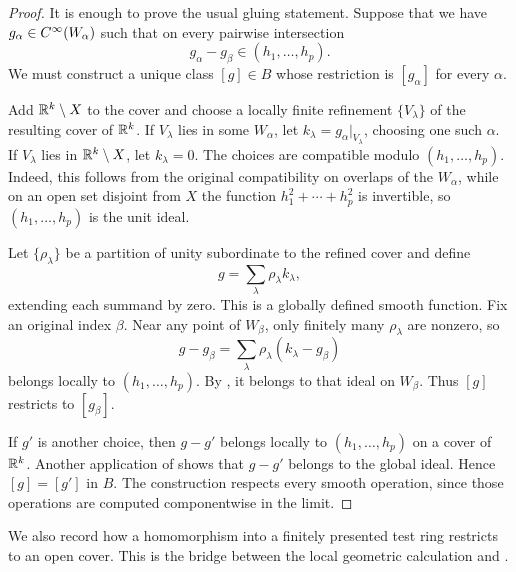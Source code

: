 \begin{proof}
  It is enough to prove the usual gluing statement. Suppose that we have
  $g_\alpha\in C^\infty(W_\alpha)$ such that on every pairwise intersection
  \[
    g_\alpha-g_\beta
    \in(h_1,\ldots,h_p).
  \]
  We must construct a unique class $[g]\in B$ whose restriction is
  $[g_\alpha]$ for every $\alpha$.

  Add $\mathbb{R}^k\setminus X$ to the cover and choose a locally finite refinement
  $\{V_\lambda\}$ of the resulting cover of $\mathbb{R}^k$. If $V_\lambda$ lies in
  some $W_\alpha$, let $k_\lambda=g_\alpha|_{V_\lambda}$, choosing one such
  $\alpha$. If $V_\lambda$ lies in $\mathbb{R}^k\setminus X$, let $k_\lambda=0$.
  The choices are compatible modulo $(h_1,\ldots,h_p)$. Indeed, this follows
  from the original compatibility on overlaps of the $W_\alpha$, while on an
  open set disjoint from $X$ the function $h_1^2+\cdots+h_p^2$ is invertible,
  so $(h_1,\ldots,h_p)$ is the unit ideal.

  Let $\{\rho_\lambda\}$ be a partition of unity subordinate to the refined
  cover and define
  \[
    g=\sum_\lambda\rho_\lambda k_\lambda,
  \]
  extending each summand by zero. This is a globally defined smooth function.
  Fix an original index $\beta$. Near any point of $W_\beta$, only finitely
  many $\rho_\lambda$ are nonzero, so
  \[
    g-g_\beta
    =\sum_\lambda\rho_\lambda(k_\lambda-g_\beta)
  \]
  belongs locally to $(h_1,\ldots,h_p)$. By
  , it belongs to that ideal on
  $W_\beta$. Thus $[g]$ restricts to $[g_\beta]$.

  If $g'$ is another choice, then $g-g'$ belongs locally to
  $(h_1,\ldots,h_p)$ on a cover of $\mathbb{R}^k$. Another application of
   shows that $g-g'$ belongs to the global
  ideal. Hence $[g]=[g']$ in $B$. The construction respects every smooth
  operation, since those operations are computed componentwise in the limit.
\end{proof}

We also record how a homomorphism into a finitely presented test ring restricts
to an open cover. This is the bridge between the local geometric calculation
and .


